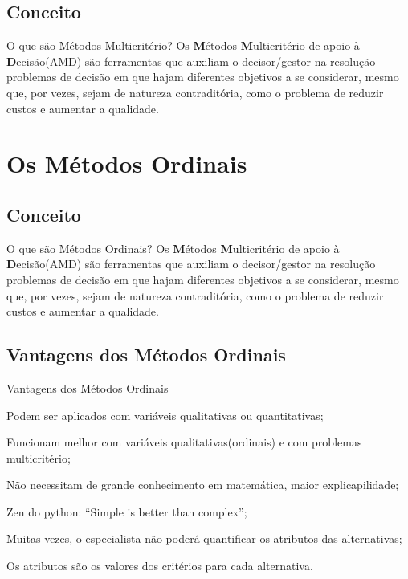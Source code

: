 \documentclass[aspectratio=169]{beamer}
\begin{document}
\subsection{Conceito}
\begin{frame}{O que são Métodos Multicritério?}
Os \textbf{M}étodos \textbf{M}ulticritério de apoio à \textbf{D}ecisão(AMD)
são ferramentas que auxiliam o decisor/gestor na resolução problemas de decisão em que hajam diferentes objetivos a se considerar, mesmo que, por vezes, sejam de natureza contraditória, como o problema de reduzir custos e aumentar a qualidade. \cite{Almeida2011}
\end{frame}

\section{Os Métodos Ordinais}
\subsection{Conceito}
\begin{frame}{O que são Métodos Ordinais?}
Os \textbf{M}étodos \textbf{M}ulticritério de apoio à \textbf{D}ecisão(AMD)
são ferramentas que auxiliam o decisor/gestor na resolução problemas de decisão em que hajam diferentes objetivos a se considerar, mesmo que, por vezes, sejam de natureza contraditória, como o problema de reduzir custos e aumentar a qualidade. \cite{Almeida2011}
\end{frame}

\subsection{Vantagens dos Métodos Ordinais}
\begin{frame}{Vantagens dos Métodos Ordinais}
\item Podem ser aplicados com variáveis qualitativas ou quantitativas;
\item Funcionam melhor com variáveis qualitativas(ordinais) e com problemas multicritério;
\item Não necessitam de grande conhecimento em matemática, maior explicapilidade;
\item Zen do python: “Simple is better than complex”;
\item Muitas vezes, o especialista não poderá quantificar os atributos das alternativas;
\item Os atributos são os valores dos critérios para cada alternativa.
\end{frame}
\end{document}

